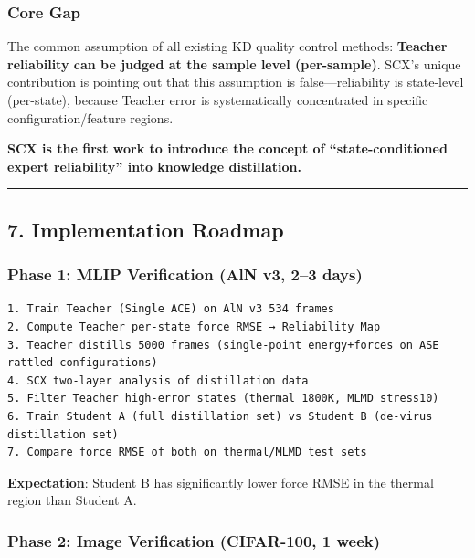\documentclass[
  12pt,
]{article}
\begin{document}
\subsubsection{Core Gap}\label{core-gap}

The common assumption of all existing KD quality control methods: \textbf{Teacher reliability can be judged at the sample level (per-sample)}. SCX's unique contribution is pointing out that this assumption is false---reliability is state-level (per-state), because Teacher error is systematically concentrated in specific configuration/feature regions.

\textbf{SCX is the first work to introduce the concept of ``state-conditioned expert reliability'' into knowledge distillation.}

\begin{center}\rule{0.5\linewidth}{0.5pt}\end{center}

\subsection{7. Implementation Roadmap}\label{implementation-roadmap}

\subsubsection{Phase 1: MLIP Verification (AlN v3, 2--3 days)}\label{phase-1-mlip-verification}

\begin{verbatim}
1. Train Teacher (Single ACE) on AlN v3 534 frames
2. Compute Teacher per-state force RMSE → Reliability Map
3. Teacher distills 5000 frames (single-point energy+forces on ASE rattled configurations)
4. SCX two-layer analysis of distillation data
5. Filter Teacher high-error states (thermal 1800K, MLMD stress10)
6. Train Student A (full distillation set) vs Student B (de-virus distillation set)
7. Compare force RMSE of both on thermal/MLMD test sets
\end{verbatim}

\textbf{Expectation}: Student B has significantly lower force RMSE in the thermal region than Student A.

\subsubsection{Phase 2: Image Verification (CIFAR-100, 1 week)}\label{phase-2-image-verification}
\end{document}
